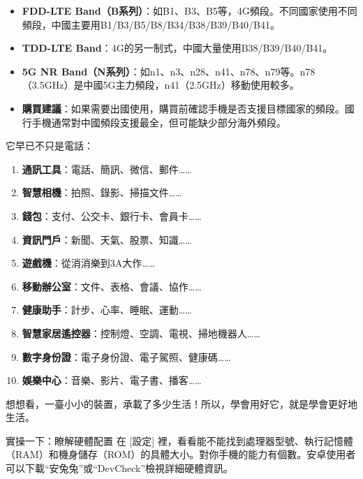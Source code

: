 \begin{itemize}
  \item \textbf{FDD-LTE Band（B系列）}：如B1、B3、B5等，4G頻段。不同國家使用不同頻段，中國主要用B1/B3/B5/B8/B34/B38/B39/B40/B41。
  \item \textbf{TDD-LTE Band}：4G的另一制式，中國大量使用B38/B39/B40/B41。
  \item \textbf{5G NR Band（N系列）}：如n1、n3、n28、n41、n78、n79等。n78（3.5GHz）是中國5G主力頻段，n41（2.5GHz）移動使用較多。
  \item \textbf{購買建議}：如果需要出國使用，購買前確認手機是否支援目標國家的頻段。國行手機通常對中國頻段支援最全，但可能缺少部分海外頻段。
\end{itemize}


它早已不只是電話：

\begin{enumerate}
  \item \textbf{通訊工具}：電話、簡訊、微信、郵件……
  \item \textbf{智慧相機}：拍照、錄影、掃描文件……
  \item \textbf{錢包}：支付、公交卡、銀行卡、會員卡……
  \item \textbf{資訊門戶}：新聞、天氣、股票、知識……
  \item \textbf{遊戲機}：從消消樂到3A大作……
  \item \textbf{移動辦公室}：文件、表格、會議、協作……
  \item \textbf{健康助手}：計步、心率、睡眠、運動……
  \item \textbf{智慧家居遙控器}：控制燈、空調、電視、掃地機器人……
  \item \textbf{數字身份證}：電子身份證、電子駕照、健康碼……
  \item \textbf{娛樂中心}：音樂、影片、電子書、播客……
\end{enumerate}

想想看，一臺小小的裝置，承載了多少生活！所以，學會用好它，就是學會更好地生活。

\begin{tcbpractice}{實操一下：瞭解硬體配置}
在 [設定] 裡，看看能不能找到處理器型號、執行記憶體（RAM）和機身儲存（ROM）的具體大小。對你手機的能力有個數。安卓使用者可以下載“安兔兔”或“DevCheck”檢視詳細硬體資訊。

\end{tcbpractice}
